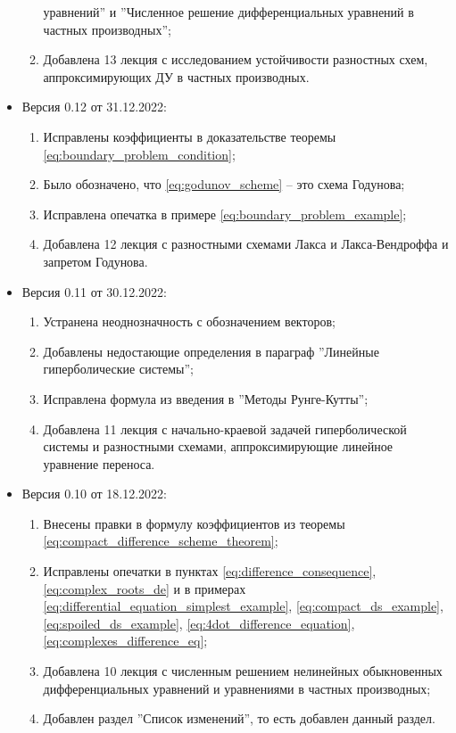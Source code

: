 \documentclass{article}
\begin{document}
\begin{itemize}[nosep]
\begin{enumerate}[nosep]
			уравнений'' и ''Численное решение дифференциальных
			уравнений в частных производных'';
		\item Добавлена 13 лекция с исследованием устойчивости
			разностных схем, аппроксимирующих ДУ в частных
			производных.
	\end{enumerate}
\item Версия 0.12 от 31.12.2022:
	\begin{enumerate}[nosep]
		\item Исправлены коэффициенты в доказательстве теоремы
			\eqref{eq:boundary_problem_condition};
		\item Было обозначено, что \eqref{eq:godunov_scheme} -- это
			схема Годунова;
		\item Исправлена опечатка в примере
			\eqref{eq:boundary_problem_example};
		\item Добавлена 12 лекция с разностными схемами Лакса и
			Лакса-Вендроффа и запретом Годунова.
	\end{enumerate}

\item Версия 0.11 от 30.12.2022:
	\begin{enumerate}[nosep]
		\item Устранена неоднозначность с обозначением векторов;
		\item Добавлены недостающие определения в параграф
			''Линейные гиперболические системы'';
		\item Исправлена формула из введения в ''Методы Рунге-Кутты'';
		\item Добавлена 11 лекция с начально-краевой задачей
			гиперболической системы и разностными схемами,
			аппроксимирующие линейное уравнение переноса.
	\end{enumerate}

\item Версия 0.10 от 18.12.2022:
	\begin{enumerate}[nosep]
		\item Внесены правки в формулу коэффициентов из
			теоремы
			\eqref{eq:compact_difference_scheme_theorem};
		\item Исправлены опечатки в пунктах
			\eqref{eq:difference_consequence},
			\eqref{eq:complex_roots_de}
			и в примерах
			\eqref{eq:differential_equation_simplest_example},
			\eqref{eq:compact_ds_example},
			\eqref{eq:spoiled_ds_example},
			\eqref{eq:4dot_difference_equation},
			\eqref{eq:complexes_difference_eq};
		\item Добавлена 10 лекция с численным решением нелинейных
			обыкновенных дифференциальных уравнений и уравнениями
			в частных производных;
		\item Добавлен раздел ''Список изменений'', то есть добавлен
			данный раздел.
	\end{enumerate}
\end{itemize}
\end{document}
